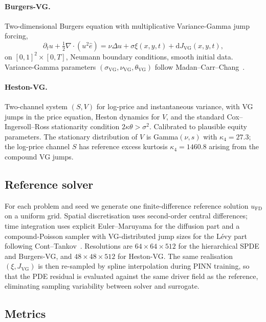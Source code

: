 \documentclass[review,12pt]{elsarticle}
\begin{document}
\paragraph{Burgers-VG.}
Two-dimensional Burgers equation with multiplicative
Variance-Gamma jump forcing,
\begin{equation}
\partial_t u + \tfrac12 \nabla \cdot (u^2 \hat e)
= \nu \Delta u + \sigma \xi(x, y, t)
+ \mathrm dJ_{\mathrm{VG}}(x, y, t),
\label{eq:burgersvg}
\end{equation}
on \([0,1]^2 \times [0, T]\), Neumann boundary conditions, smooth
initial data. Variance-Gamma parameters
\((\sigma_{\mathrm{VG}}, \nu_{\mathrm{VG}}, \theta_{\mathrm{VG}})\)
follow Madan--Carr--Chang~\cite{MadanCarrChang1998}.

\paragraph{Heston-VG.}
Two-channel system \((S, V)\) for log-price and instantaneous
variance, with VG jumps in the price equation, Heston dynamics for
\(V\), and the standard Cox--Ingersoll--Ross stationarity
condition \(2\kappa\theta > \sigma^2\). Calibrated to plausible
equity parameters. The stationary distribution of \(V\) is
Gamma\((\nu, s)\) with \(\kappa_4 = 27.3\); the log-price channel
\(S\) has reference excess kurtosis \(\kappa_4 = 1460.8\) arising
from the compound VG jumps.

\subsection{Reference solver}

For each problem and seed we generate one finite-difference
reference solution \(u_{\mathrm{FD}}\) on a uniform grid. Spatial
discretisation uses second-order central differences; time
integration uses explicit Euler--Maruyama for the diffusion part
and a compound-Poisson sampler with VG-distributed jump sizes for
the L\'evy part following Cont--Tankov~\cite{ContTankov2003}.
Resolutions are \(64\times 64 \times 512\) for the hierarchical
SPDE and Burgers-VG, and \(48\times 48 \times 512\) for
Heston-VG. The same realisation \((\xi, J_{\mathrm{VG}})\) is then
re-sampled by spline interpolation during PINN training, so that
the PDE residual is evaluated against the same driver field as
the reference, eliminating sampling variability between solver and
surrogate.

\subsection{Metrics}
\label{subsec:metrics}
\end{document}
